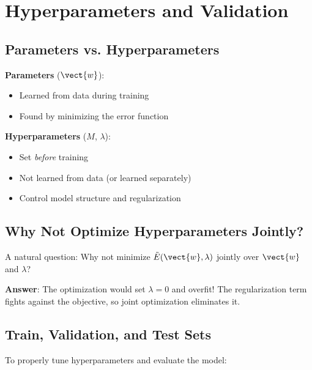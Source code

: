 
\section{Hyperparameters and Validation}

\subsection{Parameters vs. Hyperparameters}

\begin{definitionbox}
\textbf{Parameters} ($\vect{w}$):
\begin{itemize}
    \item Learned from data during training
    \item Found by minimizing the error function
\end{itemize}

\textbf{Hyperparameters} ($M$, $\lambda$):
\begin{itemize}
    \item Set \textit{before} training
    \item Not learned from data (or learned separately)
    \item Control model structure and regularization
\end{itemize}
\end{definitionbox}

\subsection{Why Not Optimize Hyperparameters Jointly?}

A natural question: Why not minimize $\tilde{E}(\vect{w}, \lambda)$ jointly over $\vect{w}$ and $\lambda$?

\textbf{Answer}: The optimization would set $\lambda = 0$ and overfit! The regularization term fights against the objective, so joint optimization eliminates it.

\subsection{Train, Validation, and Test Sets}

To properly tune hyperparameters and evaluate the model:

